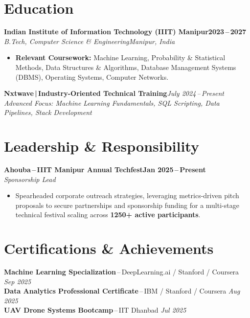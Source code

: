 \documentclass[9.5pt,a4paper]{article}
\newcommand{\entry}[4]{%
  \vspace{1.5pt}\noindent\textbf{#1}\hfill\textbf{\small#2}\\[-3.5pt]
  \textit{\small#3}\hfill\textit{\small#4}\vspace{0.2pt}%
}
\begin{document}
\section{Education}

\entry{Indian Institute of Information Technology (IIIT) Manipur}{2023\,--\,2027}
      {B.Tech, Computer Science \& Engineering}{Manipur, India}
\begin{itemize}
  \item \textbf{Relevant Coursework:} Machine Learning, Probability \& Statistical Methods, Data Structures \& Algorithms, Database Management Systems (DBMS), Operating Systems, Computer Networks.
\end{itemize}
\vspace{1.5pt}
\noindent\textbf{\small Nxtwave\,|\,Industry-Oriented Technical Training}\hfill\textit{\small July 2024\,--\,Present}\\[0pt]
{\small\textit{Advanced Focus: Machine Learning Fundamentals, SQL Scripting, Data Pipelines, Stack Development}}

\section{Leadership \& Responsibility}

\entry{Ahouba\,--\,IIIT Manipur Annual Techfest}{Jan 2025\,--\,Present}
      {Sponsorship Lead}{}
\begin{itemize}
  \item Spearheaded corporate outreach strategies, leveraging metrics-driven pitch proposals to secure partnerships and sponsorship funding for a multi-stage technical festival scaling across \textbf{1250+ active participants}.
\end{itemize}

\section{Certifications \& Achievements}

{\small
\noindent
\textbf{Machine Learning Specialization}\,--\,DeepLearning.ai / Stanford / Coursera \hfill \textit{Sep 2025}\\
\textbf{Data Analytics Professional Certificate}\,--\,IBM / Stanford / Coursera \hfill \textit{Aug 2025}\\
\textbf{UAV Drone Systems Bootcamp}\,--\,IIT Dhanbad \hfill \textit{Jul 2025}
}
\end{document}
